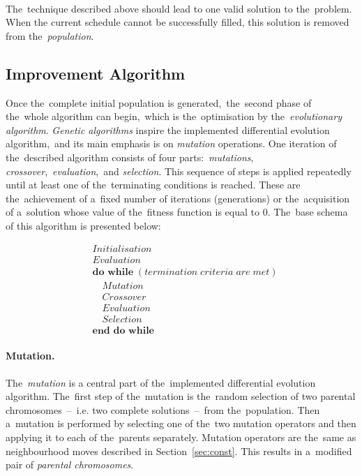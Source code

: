 \noindent\\
The~technique described above should lead to one valid solution to the~problem. 
When the current schedule cannot be successfully filled, this solution is removed from the~\textit{population}.

\subsection{Improvement Algorithm}
Once the~complete initial population is generated,~the~second phase of the~whole algorithm can begin,~which is the~optimisation by the~\textit{evolutionary algorithm}.
\textit{Genetic algorithms} inspire the implemented differential evolution algorithm,~and its main emphasis is on \textit{mutation} operations.
One iteration of the~described algorithm consists of four parts:~\textit{mutations}, \textit{crossover},~\textit{evaluation},~and \textit{selection}.
This sequence of steps is applied repeatedly until at least one of the~terminating conditions is reached.
These are the~achievement of a~fixed number of iterations (generations) or the~acquisition of a~solution whose value of the~fitness function is equal to 0.
The~base schema of this algorithm is presented below:

\begin{align*}
    & Initialisation \\
    & Evaluation \\
    & \textbf{do while} \; (termination \; criteria \; are \; met) \\
    & \quad Mutation \\
    & \quad Crossover \\
    & \quad Evaluation \\
    & \quad Selection \\
    & \textbf{end do while}
\end{align*}

\begingroup\vspace*{-\baselineskip}
\vspace*{\baselineskip}\endgroup

\paragraph{Mutation.}
The~\textit{mutation} is a central part of the~implemented differential evolution algorithm.
The~first step of the~mutation is the~random selection of two parental chromosomes \,--\, i.e. two complete solutions \,--\, from the~population.
Then a~mutation is performed by selecting one of the~two mutation operators and then applying it to each of the~parents separately.
Mutation operators are the~same as neighbourhood moves described in Section~\ref{sec:const}.
This results in a~modified pair of \textit{parental chromosomes}.


